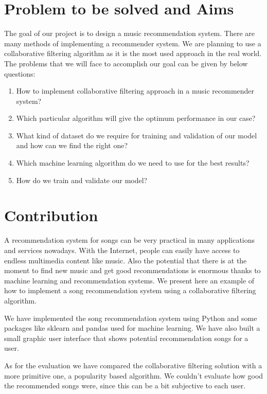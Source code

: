 \documentclass{jot}
\begin{document}
\section{Problem to be solved and Aims}
The goal of our project is to design a music recommendation system. There are many methods of implementing a recommender system. We are planning to use a collaborative filtering algorithm as it is the most used approach in the real world.
The problems that we will face to accomplish our goal can be given by below questions:
\begin{enumerate}
  \item How to implement collaborative filtering approach in a music recommender system?
  \item Which particular algorithm will give the optimum performance in our case?
  \item What kind of dataset do we require for training and validation of our model and how can we find the right one?
  \item Which machine learning algorithm do we need to use for the best results?
  \item How do we train and validate our model?
\end{enumerate}

\section{Contribution}
A recommendation system for songs can be very practical in many applications and services nowadays. With the Internet, people can easily have access to endless multimedia content like music. Also the potential that there is at the moment to find new music and get good recommendations is enormous thanks to machine learning and recommendation systems. We present here an example of how to implement a song recommendation system using a collaborative filtering algorithm.

We have implemented the song recommendation system using Python and some packages like sklearn and pandas used for machine learning. We have also built a small graphic user interface that shows potential recommendation songs for a user.

As for the evaluation we have compared the collaborative filtering solution with a more primitive one, a popularity based algorithm. We couldn’t evaluate how good the recommended songs were, since this can be a bit subjective to each user.
\end{document}
